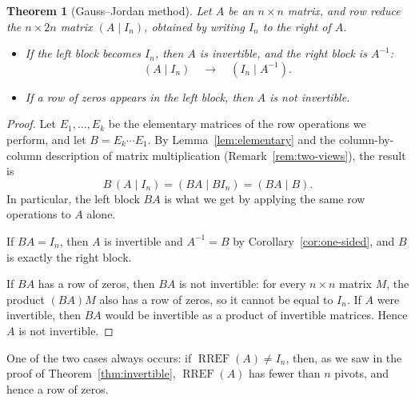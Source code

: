 \documentclass[11pt]{article}
\theoremstyle{definition}
\theoremstyle{plain}
\newtheorem{theorem}[definition]{Theorem}
\theoremstyle{remark}
\DeclareMathOperator{\RREF}{RREF}
\begin{document}
\begin{theorem}[Gauss--Jordan method]\label{thm:gauss-jordan}
    Let $A$ be an $n \times n$ matrix, and row reduce the $n \times 2n$ matrix $(A \mid I_n)$, obtained by writing $I_n$ to the right of $A$.
    \begin{itemize}
        \item If the left block becomes $I_n$, then $A$ is invertible, and the right block is $A^{-1}$:
        \[(A \mid I_n) \quad \longrightarrow \quad (I_n \mid A^{-1}).\]
        \item If a row of zeros appears in the left block, then $A$ is not invertible.
    \end{itemize}
\end{theorem}

\begin{proof}
    Let $E_1, \ldots, E_k$ be the elementary matrices of the row operations we perform, and let $B = E_k \cdots E_1$. By Lemma~\ref{lem:elementary} and the column-by-column description of matrix multiplication (Remark~\ref{rem:two-views}), the result is
    \[B\,(A \mid I_n) = (BA \mid B I_n) = (BA \mid B).\]
    In particular, the left block $BA$ is what we get by applying the same row operations to $A$ alone.

    If $BA = I_n$, then $A$ is invertible and $A^{-1} = B$ by Corollary~\ref{cor:one-sided}, and $B$ is exactly the right block.

    If $BA$ has a row of zeros, then $BA$ is not invertible: for every $n \times n$ matrix $M$, the product $(BA)M$ also has a row of zeros, so it cannot be equal to $I_n$. If $A$ were invertible, then $BA$ would be invertible as a product of invertible matrices. Hence $A$ is not invertible.
\end{proof}

One of the two cases always occurs: if $\RREF(A) \neq I_n$, then, as we saw in the proof of Theorem~\ref{thm:invertible}, $\RREF(A)$ has fewer than $n$ pivots, and hence a row of zeros.
\end{document}
